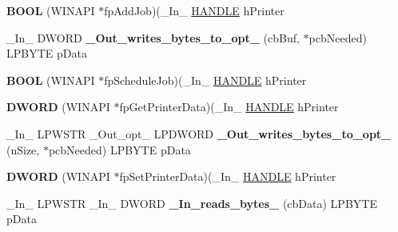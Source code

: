 \begin{DoxyCompactItemize}
\mbox{\label{struct___p_r_i_n_t_p_r_o_v_i_d_o_r_a570044ca64210d3edf2cc2c7a621582f}} 
{\bfseries B\+O\+OL} (W\+I\+N\+A\+PI $\ast$fp\+Add\+Job)(\+\_\+\+In\+\_\+ \hyperlink{interfacevoid}{H\+A\+N\+D\+LE} h\+Printer
\item 
\mbox{\label{struct___p_r_i_n_t_p_r_o_v_i_d_o_r_a2be8e50c587b47fcccd16a5e14996b50}} 
\+\_\+\+In\+\_\+ D\+W\+O\+RD {\bfseries \+\_\+\+Out\+\_\+writes\+\_\+bytes\+\_\+to\+\_\+opt\+\_\+} (cb\+Buf, $\ast$pcb\+Needed) L\+P\+B\+Y\+TE p\+Data
\item 
\mbox{\label{struct___p_r_i_n_t_p_r_o_v_i_d_o_r_afbdd8c82974327dd149e8bf825184919}} 
{\bfseries B\+O\+OL} (W\+I\+N\+A\+PI $\ast$fp\+Schedule\+Job)(\+\_\+\+In\+\_\+ \hyperlink{interfacevoid}{H\+A\+N\+D\+LE} h\+Printer
\item 
\mbox{\label{struct___p_r_i_n_t_p_r_o_v_i_d_o_r_adf1731cc6c0d4e5569a063d117a9fa34}} 
{\bfseries D\+W\+O\+RD} (W\+I\+N\+A\+PI $\ast$fp\+Get\+Printer\+Data)(\+\_\+\+In\+\_\+ \hyperlink{interfacevoid}{H\+A\+N\+D\+LE} h\+Printer
\item 
\mbox{\label{struct___p_r_i_n_t_p_r_o_v_i_d_o_r_a4c500978d8967c32baa9f3a4249dca5c}} 
\+\_\+\+In\+\_\+ L\+P\+W\+S\+TR \+\_\+\+Out\+\_\+opt\+\_\+ L\+P\+D\+W\+O\+RD {\bfseries \+\_\+\+Out\+\_\+writes\+\_\+bytes\+\_\+to\+\_\+opt\+\_\+} (n\+Size, $\ast$pcb\+Needed) L\+P\+B\+Y\+TE p\+Data
\item 
\mbox{\label{struct___p_r_i_n_t_p_r_o_v_i_d_o_r_a3a67f3ed88a72c0f7e4895132dd88c2c}} 
{\bfseries D\+W\+O\+RD} (W\+I\+N\+A\+PI $\ast$fp\+Set\+Printer\+Data)(\+\_\+\+In\+\_\+ \hyperlink{interfacevoid}{H\+A\+N\+D\+LE} h\+Printer
\item 
\mbox{\label{struct___p_r_i_n_t_p_r_o_v_i_d_o_r_acecdc0a6eafaf542a914a6aba746e172}} 
\+\_\+\+In\+\_\+ L\+P\+W\+S\+TR \+\_\+\+In\+\_\+ D\+W\+O\+RD {\bfseries \+\_\+\+In\+\_\+reads\+\_\+bytes\+\_\+} (cb\+Data) L\+P\+B\+Y\+TE p\+Data
\item 
\mbox{\label{struct___p_r_i_n_t_p_r_o_v_i_d_o_r_a1334ac70326885065ea6b62c35267936}} 

\end{DoxyCompactItemize}
